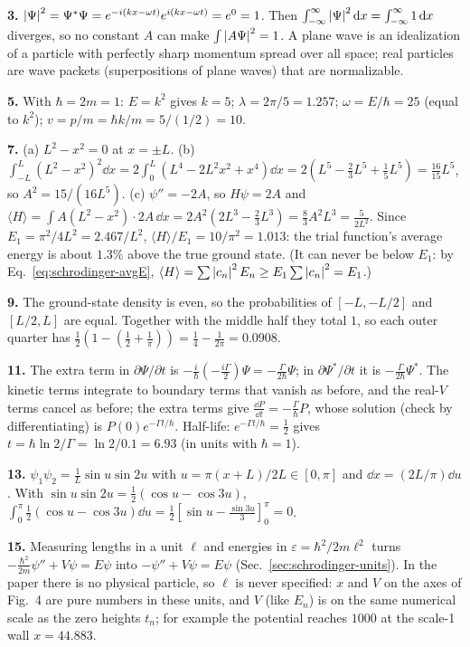 \textbf{3.} $\left\lvert \Psi\right\rvert^2=\Psi^*\Psi=e^{-i(kx-\omega t)}e^{i(kx-\omega t)}=e^0=1$. Then $\int_{-\infty}^\infty\left\lvert \Psi\right\rvert^2\mathrm{d} x=\int_{-\infty}^\infty1\,\mathrm{d} x$ diverges, so no constant $A$ can make $\int\left\lvert A\Psi\right\rvert^2=1$. A plane wave is an idealization of a particle with perfectly sharp momentum spread over all space; real particles are wave packets (superpositions of plane waves) that are normalizable.

\textbf{5.} With $\hbar=2m=1$: $E=k^2$ gives $k=5$; $\lambda=2\pi/5=1.257$; $\omega=E/\hbar=25$ (equal to $k^2$); $v=p/m=\hbar k/m=5/(1/2)=10$.

\textbf{7.} (a) $L^2-x^2=0$ at $x=\pm L$. (b) $\int_{-L}^L(L^2-x^2)^2\dd x=2\int_0^L(L^4-2L^2x^2+x^4)\dd x=2\left(L^5-\tfrac23L^5+\tfrac15L^5\right)=\tfrac{16}{15}L^5$, so $A^2=15/(16L^5)$. (c) $\psi''=-2A$, so $H\psi=2A$ and $\langle H\rangle=\int A(L^2-x^2)\cdot2A\,\dd x=2A^2\left(2L^3-\tfrac23L^3\right)=\tfrac83A^2L^3=\frac{5}{2L^2}$. Since $E_1=\pi^2/4L^2=2.467/L^2$, $\langle H\rangle/E_1=10/\pi^2=1.013$: the trial function's average energy is about $1.3\%$ above the true ground state. (It can never be below $E_1$: by Eq.~\eqref{eq:schrodinger-avgE}, $\langle H\rangle=\sum\left\lvert c_n\right\rvert^2E_n\ge E_1\sum\left\lvert c_n\right\rvert^2=E_1$.)

\textbf{9.} The ground-state density is even, so the probabilities of $[-L,-L/2]$ and $[L/2,L]$ are equal. Together with the middle half they total $1$, so each outer quarter has $\frac12\left(1-\left(\frac12+\frac1\pi\right)\right)=\frac14-\frac1{2\pi}=0.0908$.

\textbf{11.} The extra term in $\partial\Psi/\partial t$ is $-\frac i\hbar(-\frac{i\Gamma}2)\Psi=-\frac\Gamma{2\hbar}\Psi$; in $\partial\Psi^*/\partial t$ it is $-\frac{\Gamma}{2\hbar}\Psi^*$. The kinetic terms integrate to boundary terms that vanish as before, and the real-$V$ terms cancel as before; the extra terms give $\frac{\dd P}{\dd t}=-\frac\Gamma\hbar P$, whose solution (check by differentiating) is $P(0)e^{-\Gamma t/\hbar}$. Half-life: $e^{-\Gamma t/\hbar}=\frac12$ gives $t=\hbar\ln2/\Gamma=\ln2/0.1=6.93$ (in units with $\hbar=1$).

\textbf{13.} $\psi_1\psi_2=\frac1L\sin u\sin2u$ with $u=\pi(x+L)/2L\in[0,\pi]$ and $\dd x=(2L/\pi)\dd u$. With $\sin u\sin2u=\frac12(\cos u-\cos3u)$, $\int_0^\pi\frac12(\cos u-\cos3u)\dd u=\frac12\left[\sin u-\frac{\sin3u}3\right]_0^\pi=0$.

\textbf{15.} Measuring lengths in a unit $\ell$ and energies in $\varepsilon=\hbar^2/2m\ell^2$ turns $-\frac{\hbar^2}{2m}\psi''+V\psi=E\psi$ into $-\psi''+V\psi=E\psi$ (Sec.~\ref{sec:schrodinger-units}). In the paper there is no physical particle, so $\ell$ is never specified: $x$ and $V$ on the axes of Fig.~4 are pure numbers in these units, and $V$ (like $E_n$) is on the same numerical scale as the zero heights $t_n$; for example the potential reaches $1000$ at the scale-1 wall $x=44.883$.

